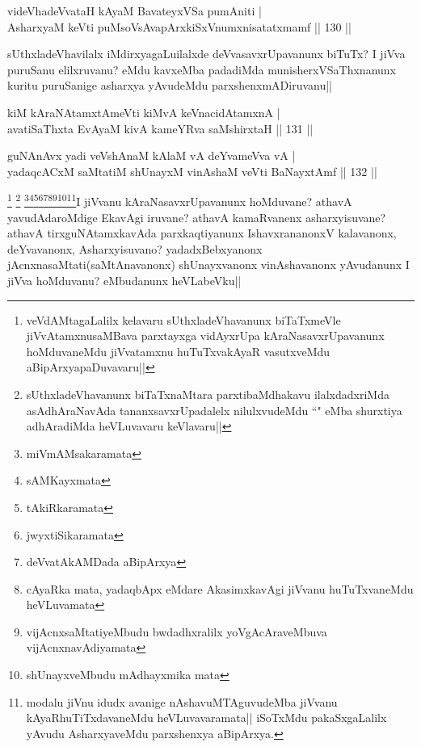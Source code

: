 
\begin{shl}
videVhadeVvataH kAyaM BavateyxVSa pumAniti |\\
AsharxyaM keVti puMsoV\s sAvapArxkiSxVnumxnisatatxmamf \hfill || 130 ||
\end{shl}

\begin{artha}
sUthxladeVhavilalx iMdirxyagaLuilalxde deVvasavxrUpavanunx biTuTx? I jiVva puruSanu elilxruvanu? eMdu kavxeMba padadiMda munisherxVSaThxnanunx kuritu puruSanige asharxya yAvudeMdu parxshenxmADiruvanu||
\end{artha}


\begin{shl}
kiM kAraNAtamxtAmeVti kiMvA keVnacidAtamxnA |\\
avatiSaThxta EvAyaM kivA kameYRva saMshirxtaH \hfill || 131 ||
\end{shl}

\begin{shl}
guNAnAvx yadi veVshAnaM kAlaM vA deYvameVva vA |\\
yadaqcACxM saMtatiM shUnayxM vinAshaM veVti BaNayxtAmf \hfill || 132 ||
\end{shl}

\begin{artha}
\footnote{veVdAMtagaLalilx kelavaru sUthxladeVhavanunx biTaTxmeVle jiVvAtamxnusaMBava parxtayxga vidAyxrUpa kAraNasavxrUpavanunx hoMduvaneMdu jiVvatamxnu huTuTxvakAyaR vasutxveMdu aBipArxyapaDuvavaru||} \footnote{sUthxladeVhavanunx biTaTxnaMtara parxtibaMdhakavu ilalxdadxriMda asAdhAraNavAda tananxsavxrUpadalelx nilulxvudeMdu ``\stext" eMba shurxtiya adhAradiMda heVLuvavaru keVlavaru||} \footnote{miVmAMsakaramata}\footnote{sAMKayxmata}\footnote{tAkiRkaramata}\footnote{jwyxtiSikaramata}\footnote{deVvatAkAMDada aBipArxya}\footnote{cAyaRka mata, yadaqbApx eMdare AkasimxkavAgi jiVvanu huTuTxvaneMdu heVLuvamata}\footnote{vijAcnxsaMtatiyeMbudu bwdadhxralilx yoVgAcAraveMbuva vijAcnxnavAdiyamata}\footnote{shUnayxveMbudu mAdhayxmika mata}\footnote{modalu jiVnu idudx avanige nAshavuMTAguvudeMba jiVvanu kAyaRhuTiTxdavaneMdu heVLuvavaramata|| iSoTxMdu pakaSxgaLalilx yAvudu AsharxyaveMdu parxshenxya aBipArxya.}I jiVvanu kAraNasavxrUpavanunx hoMduvane? athavA yavudAdaroMdige EkavAgi iruvane? athavA kamaRvanenx asharxyisuvane? athavA tirxguNAtamxkavAda parxkaqtiyanunx IshavxrananonxV kalavanonx, deYvavanonx, Asharxyisuvano? yadadxBebxyanonx jAcnxnasaMtati(saMtAnavanonx) shUnayxvanonx vinAshavanonx yAvudanunx I jiVva hoMduvanu? eMbudanunx heVLabeVku||
\end{artha}

